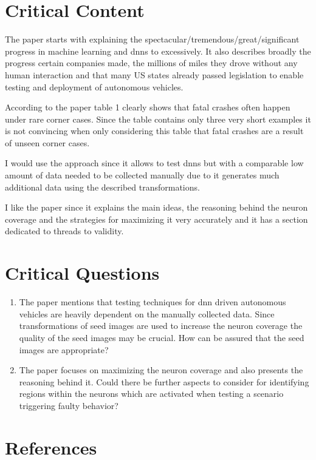 \documentclass[oneside, notitlepage, twocolumn]{scrartcl}
\begin{document}
\section{Critical Content}
The paper starts with explaining the spectacular/tremendous/great/significant progress in machine learning and \glspl{dnn} to excessively.
It also describes broadly the progress certain companies made, the millions of miles they drove without any human interaction and that many US states already passed legislation to enable testing and deployment of autonomous vehicles.\par
According to the paper table 1 clearly shows that fatal crashes often happen under rare corner cases.
Since the table contains only three very short examples it is not convincing when only considering this table that fatal crashes are a result of unseen corner cases.\par
I would use the approach since it allows to test \glspl{dnn} but with a comparable low amount of data needed to be collected manually due to it generates much additional data using the described transformations.\par
I like the paper since it explains the main ideas, the reasoning behind the neuron coverage and the strategies for maximizing it very accurately and it has a section dedicated to threads to validity.

\section{Critical Questions}
\begin{enumerate}
    \item The paper mentions that testing techniques for \gls{dnn} driven autonomous vehicles are heavily dependent on the manually collected data.
        Since transformations of seed images are used to increase the neuron coverage the quality of the seed images may be crucial.
        How can be assured that the seed images are appropriate?
    \item The paper focuses on maximizing the neuron coverage and also presents the reasoning behind it.
        Could there be further aspects to consider for identifying regions within the neurons which are activated when testing a scenario triggering faulty behavior?
\end{enumerate}

\section{References}
\begingroup
\renewcommand{\section}[2]{}%
\nocite{*}
\printbibliography%
\endgroup
\end{document}
